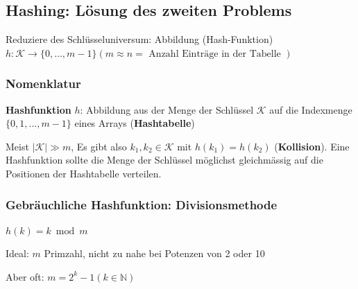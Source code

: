 \begin{sectionbox}
\subsection{Hashing: Lösung des zweiten Problems}\smallskip
Reduziere des Schlüsseluniversum: Abbildung (Hash-Funktion) $h: \mathcal{K} \rightarrow\{0, \ldots, m-1\}(m \approx n=\text { Anzahl Einträge in der Tabelle })$\par\vspace{7px}

\subsubsection{Nomenklatur}\par\smallskip
\textbf{Hashfunktion} $h$: Abbildung aus der Menge der Schlüssel $\mathcal{K}$ auf die Indexmenge $\{0,1, \ldots, m-1\}$ eines Arrays (\textbf{Hashtabelle})\par
Meist $|\mathcal{K}| \gg m$, Es gibt also $k_{1}, k_{2} \in \mathcal{K}$ mit $h\left(k_{1}\right)=h\left(k_{2}\right)$ (\textbf{Kollision}). Eine Hashfunktion sollte die Menge der Schlüssel möglichst gleichmässig auf die Positionen der Hashtabelle verteilen.\par\vspace{7px}

\subsubsection{Gebräuchliche Hashfunktion: Divisionsmethode}\par\smallskip
\begin{center}
    $h(k)=k \bmod m$
\end{center}
Ideal: $m$ Primzahl, nicht zu nahe bei Potenzen von 2 oder 10\par
Aber oft: $m=2^{k}-1(k \in \mathbb{N})$
\end{sectionbox}
\vspace{-4pt}

